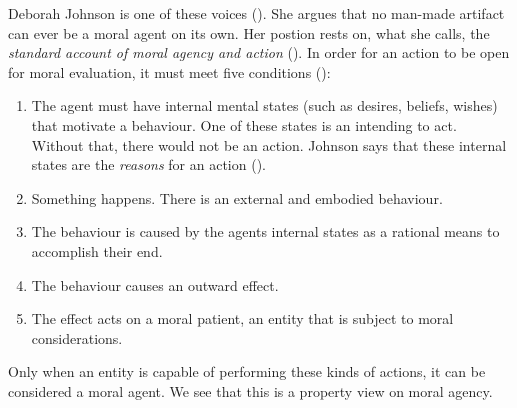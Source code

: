 \documentclass{article}
\begin{document}
\newpage
Deborah Johnson is one of these voices (\cite{johnson2006computer}). She argues
that no man-made artifact can ever be a moral agent on its own. Her postion rests on, what
she calls, the \textit{standard account of moral agency and action} (\cite[p.
198]{johnson2006computer}). In order for an action to be open for moral
evaluation, it must meet five conditions (\cite[p.
198]{johnson2006computer}):

\begin{enumerate}
	\item The agent must have internal mental states (such as desires,
		beliefs, wishes) that motivate a behaviour. One of these states
		is an intending to act. Without that, there would not be an
		action. Johnson says that these internal states are the
		\textit{reasons} for an action (\cite[p.  198]{johnson2006computer}).
	\item Something happens. There is an external and embodied behaviour.
	\item The behaviour is caused by the agents internal states as a
		rational means to accomplish their end.
	\item The behaviour causes an outward effect.
	\item The effect acts on a moral patient, an entity that is subject to
		moral considerations.
\end{enumerate}

Only when an entity is capable of performing these kinds of actions, it can be
considered a moral agent. We see that this is a property view on moral agency.\\
\end{document}
